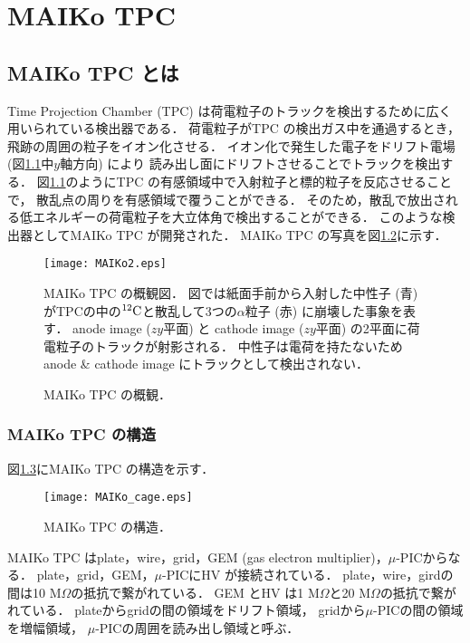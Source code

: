 \documentclass[../master]{subfiles}
\begin{document}
\chapter{MAIKo TPC}
\section{MAIKo TPC とは}
Time Projection Chamber (TPC) は荷電粒子のトラックを検出するために広く用いられている検出器である．
荷電粒子がTPC の検出ガス中を通過するとき，飛跡の周囲の粒子をイオン化させる．
イオン化で発生した電子をドリフト電場 (図\ref{fig::MAIKo_view}中$y$軸方向) により
読み出し面にドリフトさせることでトラックを検出する．
図\ref{fig::MAIKo_view}のようにTPC の有感領域中で入射粒子と標的粒子を反応させることで，
散乱点の周りを有感領域で覆うことができる．
そのため，散乱で放出される低エネルギーの荷電粒子を大立体角で検出することができる．
このような検出器としてMAIKo TPC が開発された．
MAIKo TPC の写真を図\ref{pic::MAIKo}に示す．
\begin{figure}
  \centering
  \texttt{[image: MAIKo2.eps]}
  \caption[MAIKo TPC の概観図．]{MAIKo TPC の概観図．
    図では紙面手前から入射した中性子 (青) がTPCの中の${}^{12}{\rm C}$と散乱して3つの$\alpha$粒子 (赤) に崩壊した事象を表す．
    anode image ($zy$平面) と cathode image ($zy$平面) の2平面に荷電粒子のトラックが射影される．
    中性子は電荷を持たないためanode \& cathode image にトラックとして検出されない．
  }
  \label{fig::MAIKo_view}
\end{figure}
\begin{figure}
  \centering
  \caption[MAIKo TPC の概観．]{MAIKo TPC の概観．}
  \label{pic::MAIKo}
\end{figure}

\subsection{MAIKo TPC の構造}
\label{sec::maiko-cage}
図\ref{fig::MAIKo_cage}にMAIKo TPC の構造を示す．
\begin{figure}
  \centering
  \texttt{[image: MAIKo\_cage.eps]}
  \caption{MAIKo TPC の構造．}
  \label{fig::MAIKo_cage}
\end{figure}
MAIKo TPC はplate，wire，grid，GEM (gas electron multiplier)，$\mu$-PICからなる．
plate，grid，GEM，$\mu$-PICにHV が接続されている．
plate，wire，girdの間は10 M$\Omega$の抵抗で繋がれている．
GEM とHV は1 M$\Omega$と20 M$\Omega$の抵抗で繋がれている．
plateからgridの間の領域をドリフト領域，
gridから$\mu$-PICの間の領域を増幅領域，
$\mu$-PICの周囲を読み出し領域と呼ぶ．
\end{document}
